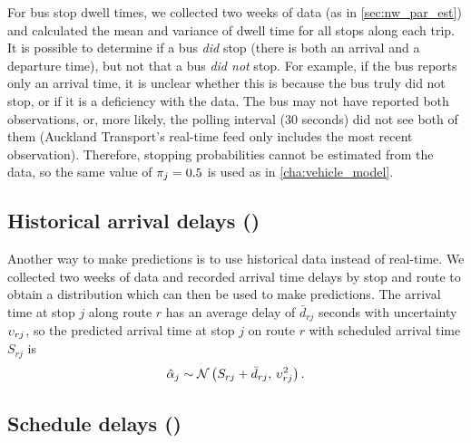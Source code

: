 For bus stop dwell times, we collected two weeks of data (as in \cref{sec:nw_par_est}) and calculated the mean and variance of dwell time for all stops along each trip. It is possible to determine if a bus \emph{did} stop (there is both an arrival and a departure time), but not that a bus \emph{did not} stop. For example, if the bus reports only an arrival time, it is unclear whether this is because the bus truly did not stop, or if it is a deficiency with the data. The bus may not have reported both observations, or, more likely, the polling interval (30 seconds) did not see both of them (Auckland Transport's real-time feed only includes the most recent observation). Therefore, stopping probabilities cannot be estimated from the data, so the same value of $\pi_j=0.5$ is used as in \cref{cha:vehicle_model}.





\subsection[Historical arrival delays]{Historical arrival delays (\Fhist{})}
\label{eq:prediction_arrival_historical}

Another way to make predictions is to use historical data instead of real-time. We collected two weeks of data and recorded arrival time delays by stop and route to obtain a distribution which can then be used to make predictions. The arrival time at stop $j$ along route $r$ has an average delay of $\bar d_{rj}$ seconds with uncertainty $\upsilon_{rj}$, so the predicted arrival time at stop $j$ on route $r$ with scheduled arrival time $S_{rj}$ is
\begin{equation}
\label{eq:arrival_pred_historical}
\hat{\alpha}_{j} \sim \mathcal{N}\left(S_{rj} + \bar d_{rj},\, \upsilon_{rj}^2\right).
\end{equation}


\subsection[Schedule delays]{Schedule delays (\Fsched{})}
\label{eq:prediction_arrival_sched_delay}




